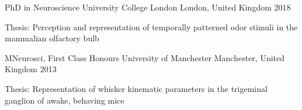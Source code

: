 

\begin{cventries}

  \cventry%
    {PhD in Neuroscience} %
    {University College London} %
    {London, United Kingdom} %
    {2018} %
    {%
      \begin{cvitems} %
        \item {Thesis: Perception and representation of temporally patterned odor stimuli in the mammalian olfactory bulb}
      \end{cvitems}
    }

  \cventry%
    {MNeurosci, First Class Honours} %
    {University of Manchester} %
    {Manchester, United Kingdom} %
    {2013} %
    {%
      \begin{cvitems}
        \item {Thesis: Representation of whisker kinematic parameters in the trigeminal ganglion of awake, behaving mice}
      \end{cvitems}
    }
    
\end{cventries}
